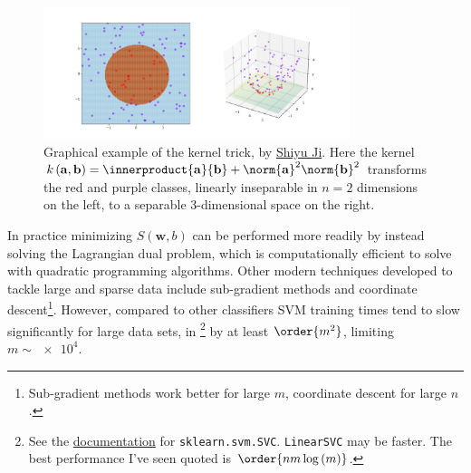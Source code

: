 \vspace{-0.3cm}%

\begin{figure}[H]
\centering
\includegraphics[width=0.8\textwidth,trim={4.0cm 0.8cm 4.0cm 1.4cm},clip]{figures/ml/kernel_trick_example.png}%
\caption{
Graphical example of the kernel trick, by \href{https://en.wikipedia.org/wiki/File:Kernel_trick_idea.svg}{Shiyu Ji}.
Here the kernel $k\left(\mathbf{a},\mathbf{b}\right) = \innerproduct{\mathbf{a}}{\mathbf{b}} + \norm{\mathbf{a}}^{2} \norm{\mathbf{b}}^{2}$
transforms the red and purple classes, linearly inseparable in $n=2$ dimensions on the left,
to a separable $3$-dimensional space on the right.
}
\label{fig:svm_kernel_trick}
\end{figure}

In practice minimizing $S\left(\mathbf{w}, b\right)$ can be
performed more readily by instead solving the Lagrangian dual problem,
which is computationally efficient to solve with quadratic programming algorithms.
Other modern techniques developed to tackle large and sparse data include
sub-gradient methods and coordinate descent\footnote{Sub-gradient methods work better for large $m$,
coordinate descent for large $n$.}.
However, compared to other classifiers SVM training times
tend to slow significantly for large data sets,
in \sklearn\footnote{See the
\href{https://scikit-learn.org/stable/modules/generated/sklearn.svm.SVC.html}{documentation}
for \texttt{sklearn.svm.SVC}.
\texttt{LinearSVC} may be faster.
The best performance I've seen quoted is $\order{n m \log{\left(m\right)}}$.} by
at least $\order{m^{2}}$, limiting $m \sim \num{e4}$.


